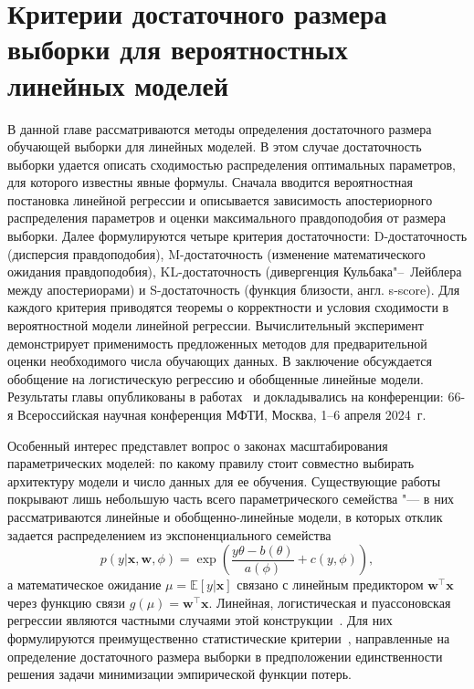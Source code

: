 \chapter{Критерии достаточного размера выборки для вероятностных линейных моделей}\label{ch:linear}

В данной главе рассматриваются методы определения достаточного размера обучающей выборки для линейных моделей. В этом случае достаточность выборки удается описать сходимостью распределения оптимальных параметров, для которого известны явные формулы. Сначала вводится вероятностная постановка линейной регрессии и описывается зависимость апостериорного распределения параметров и оценки максимального правдоподобия от размера выборки. Далее формулируются четыре критерия достаточности: D-достаточность (дисперсия правдоподобия), M-достаточность (изменение математического ожидания правдоподобия), KL-достаточность (дивергенция Кульбака"--~Лейблера между апостериорами) и S-достаточность (функция близости, англ. s-score). Для каждого критерия приводятся теоремы о корректности и условия сходимости в вероятностной модели линейной регрессии. Вычислительный эксперимент демонстрирует применимость предложенных методов для предварительной оценки необходимого числа обучающих данных. В заключение обсуждается обобщение на логистическую регрессию и обобщенные линейные модели. Результаты главы опубликованы в работах~\cite{kiselev2025ssdpdp,kiselev2025ssdlb,kiselev2024conf66mipt} и докладывались на конференции: 66-я Всероссийская научная конференция МФТИ, Москва, 1--6 апреля 2024~г.


Особенный интерес представлет вопрос о законах масштабирования параметрических моделей: по какому правилу стоит совместно выбирать архитектуру модели и число данных для ее обучения. Существующие работы покрывают лишь небольшую часть всего параметрического семейства "--- в них рассматриваются линейные и обобщенно-линейные модели, в которых отклик задается распределением из экспоненциального семейства
\[
p(y | \mathbf x, \mathbf w, \phi)
=
\exp\!\left(
\frac{y\theta-b(\theta)}{a(\phi)} + c(y, \phi)
\right),
\]
а математическое ожидание $\mu=\mathbb E[y | \mathbf x]$ связано с линейным предиктором $\mathbf w^\top \mathbf x$ через функцию связи $g(\mu)=\mathbf w^\top \mathbf x$. Линейная, логистическая и пуассоновская регрессии являются частными случаями этой конструкции~\cite{mccullagh1989generalized}. Для них формулируются преимущественно статистические критерии~\cite{self1988,self1992,shieh2000,shieh2005,demidenko2007}, направленные на определение достаточного размера выборки в предположении единственности решения задачи минимизации эмпирической функции потерь.

